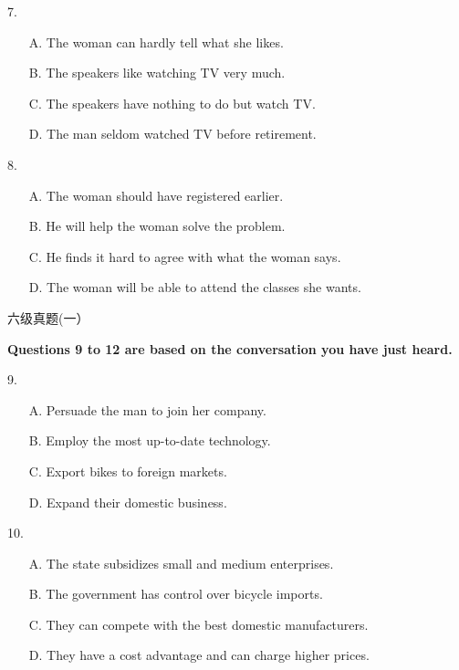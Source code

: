 \documentclass[UTF8,11pt]{ctexart}
\begin{document}
7.


\begin{itemize}[leftmargin=2em,itemsep=.2em,topsep=.4em]\item[A.] The woman can hardly tell what she likes.
\item[B.] The speakers like watching TV very much.
\item[C.] The speakers have nothing to do but watch TV.
\item[D.] The man seldom watched TV before retirement.
\end{itemize}

8.


\begin{itemize}[leftmargin=2em,itemsep=.2em,topsep=.4em]\item[A.] The woman should have registered earlier.
\item[B.] He will help the woman solve the problem.
\item[C.] He finds it hard to agree with what the woman says.
\item[D.] The woman will be able to attend the classes she wants.
\end{itemize}

六级真题(一）


\textbf{Questions 9 to 12 are based on the conversation you have just heard.}


9.


\begin{itemize}[leftmargin=2em,itemsep=.2em,topsep=.4em]\item[A.] Persuade the man to join her company.
\item[B.] Employ the most up-to-date technology.
\item[C.] Export bikes to foreign markets.
\item[D.] Expand their domestic business.
\end{itemize}

10.


\begin{itemize}[leftmargin=2em,itemsep=.2em,topsep=.4em]\item[A.] The state subsidizes small and medium enterprises.
\item[B.] The government has control over bicycle imports.
\item[C.] They can compete with the best domestic manufacturers.
\item[D.] They have a cost advantage and can charge higher prices.
\end{itemize}
\end{document}
